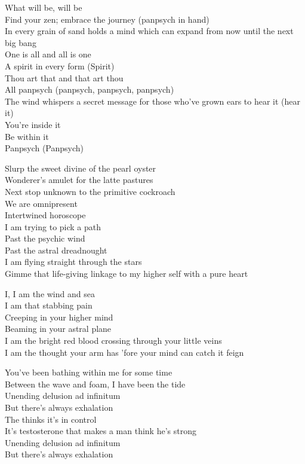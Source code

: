 What will be, will be\\
Find your zen; embrace the journey (panpsych in hand)\\
In every grain of sand holds a mind which can expand from now until the next big bang\\

One is all and all is one\\
A spirit in every form (Spirit)\\
Thou art that and that art thou\\
All panpsych (panpsych, panpsych, panpsych)\\
The wind whispers a secret message for those who've grown ears to hear it (hear it)\\
You're inside it\\
Be within it\\
Panpsych (Panpsych)\\


Slurp the sweet divine of the pearl oyster\\
Wonderer's amulet for the latte pastures\\
Next stop unknown to the primitive cockroach\\
We are omnipresent\\
Intertwined horoscope\\

I am trying to pick a path\\
Past the psychic wind\\
Past the astral dreadnought\\
I am flying straight through the stars\\
Gimme that life-giving linkage to my higher self with a pure heart\\


I, I am the wind and sea\\
I am that stabbing pain\\
Creeping in your higher mind\\
Beaming in your astral plane\\
I am the bright red blood crossing through your little veins\\
I am the thought your arm has 'fore your mind can catch it feign\\


You've been bathing within me for some time\\
Between the wave and foam, I have been the tide\\
Unending delusion ad infinitum\\
But there's always exhalation\\
The  thinks it's in control\\
It's testosterone that makes a man think he's strong\\
Unending delusion ad infinitum\\
But there's always exhalation\\

